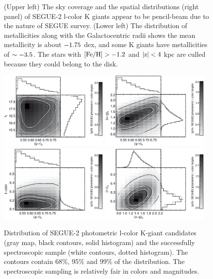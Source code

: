 \documentclass[12pt,preprint]{aastex}
\newcommand{\feh}{{\rm [Fe/H]}}
\begin{document}
\begin{figure}
\caption{(Upper left) The sky coverage and the spatial distributions (right panel) of SEGUE-2 l-color K giants appear to be pencil-beam due to the nature of SEGUE survey. (Lower left) The distribution of metallicities along with the Galactocentric radii shows the mean metallicity is about $\rm -1.75~$dex, and some K giants have metallicities of $\rm \sim -3.5$. The stars with $\rm \feh>-1.2$ and $\rm |z|<4~$kpc are culled because they could belong to the disk.}
\label{f:fkgdistribution}
\end{figure}
\begin{figure}[htbp]
\centering
\includegraphics[width=0.48\textwidth,height=0.3\textheight]{gmrvsr0_lctarget}
\includegraphics[width=0.48\textwidth,height=0.3\textheight]{gmrvsumg_lctarget}
\includegraphics[width=0.48\textwidth,height=0.3\textheight]{gmrvslcolor_lctarget}
\includegraphics[width=0.48\textwidth,height=0.3\textheight]{umgvsrmi_lctarget}
\caption{Distribution of SEGUE-2 photometric l-color K-giant candidates (gray map, black contours, solid histogram) and the successfully spectroscopic sample (white contours, dotted histogram). The contours contain 68\%, 95\% and 99\% of the distribution. The spectroscopic sampling is relatively fair in colors and magnitudes.}
\label{f:flkgbias}
\end{figure}
\end{document}
